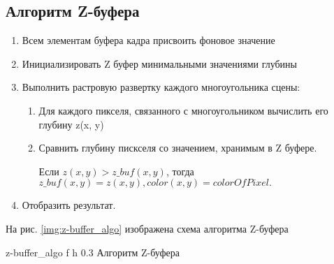 \subsection{Алгоритм Z-буфера}
\begin{enumerate}
    \item Всем элементам буфера кадра присвоить фоновое значение
    \item Инициализировать Z буфер минимальными значениями глубины
    \item Выполнить растровую развертку каждого многоугольника сцены:
    \begin{enumerate}
        \item Для каждого пикселя, связанного с многоугольником вычислить его
        глубину z(x, y)
        \item Сравнить глубину пискселя со значением, хранимым в Z буфере.

            Если \(z(x, y) > z\_buf(x, y) \), тогда\newline
            \(z\_buf(x,y) = z(x,y), color(x, y) = colorOfPixel.\)
    \end{enumerate}
    \item Отобразить результат.
\end{enumerate}

На рис. \ref{img:z-buffer_algo} изображена схема алгоритма Z-буфера

{z-buffer_algo} %
{f} %
{h} %
{0.3\textwidth} %
{Алгоритм Z-буфера} %
\clearpage
%
